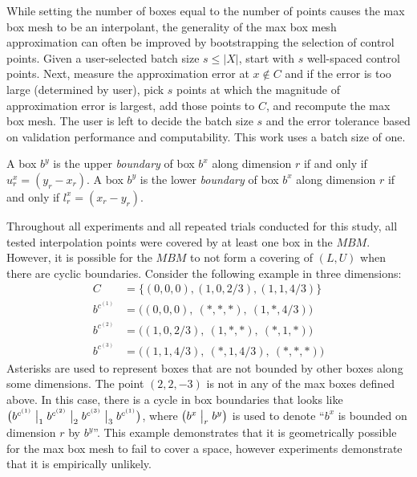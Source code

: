 While setting the number of boxes equal to the number of points causes the max box mesh to be an interpolant, the generality of the max box mesh approximation can often be improved by bootstrapping the selection of control points. Given a user-selected batch size $s \leq |X|$, start with $s$ well-spaced control points. Next, measure the approximation error at $x \notin C$ and if the error is too large (determined by user), pick $s$ points at which the magnitude of approximation error is largest, add those points to $C$, and recompute the max box mesh. The user is left to decide the batch size $s$ and the error tolerance based on validation performance and computability. This work uses a batch size of one.

\begin{definition}
A box $b^y$ is the upper \textit{boundary} of box $b^x$ along dimension $r$ if and only if $u^x_r = (y_r - x_r)$. A box $b^y$ is the lower \textit{boundary} of box $b^x$ along dimension $r$ if and only if $l^x_r = (x_r - y_r)$.
\end{definition}

Throughout all experiments and all repeated trials conducted for this study, all tested interpolation points were covered by at least one box in the $MBM$. However, it is possible for the $MBM$ to not form a covering of $(L,U)$ when there are cyclic boundaries. Consider the following example in three dimensions:
\begin{align*}
  C         &= \bigl\{(0,0,0), (1,0,2/3), (1,1,4/3)\bigr\} \\
  b^{c^{(1)}} &= \bigl( (0,0,0),  \ (*,*,*),  \ (1,*,4/3) \bigr) \\
  b^{c^{(2)}} &= \bigl( (1,0,2/3),\ (1,*,*),  \ (*,1,*)   \bigr) \\
  b^{c^{(3)}} &= \bigl( (1,1,4/3),\ (*,1,4/3),\ (*,*,*)   \bigr)
\end{align*}
Asterisks are used to represent boxes that are not bounded by other boxes along some dimensions. The point $(2,2,-3)$ is not in any of the max boxes defined above. In this case, there is a cycle in box boundaries that looks like $\bigl( b^{c^{(1)}} \bigm\vert_1 b^{c^{(2)}} \bigm\vert_2 b^{c^{(3)}} \bigm\vert_3 b^{c^{(1)}} \bigr)$, where $\bigl( b^x \bigm\vert_r b^y \bigr)$ is used to denote ``$b^x$ is bounded on dimension $r$ by $b^y$''. This example demonstrates that it is geometrically possible for the max box mesh to fail to cover a space, however experiments demonstrate that it is empirically unlikely.

